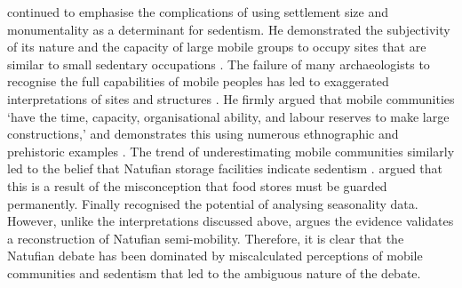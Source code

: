 \documentclass[%
	]{ijsra}
\begin{document}
\textcite[17]{Edwards_1989} continued to emphasise the complications of using settlement size and monumentality as a determinant for sedentism. He demonstrated the subjectivity of its nature and the capacity of large mobile groups to occupy sites that are similar to small sedentary occupations \parencite[17]{Edwards_1989}. 
The failure of many archaeologists to recognise the full capabilities of mobile peoples has led to exaggerated interpretations of sites and structures \parencite[17]{Edwards_1989}. 
He firmly argued that mobile communities ‘have the time, capacity, organisational ability, and labour reserves to make large constructions,’ and demonstrates this using numerous ethnographic and prehistoric examples \parencite[17]{Edwards_1989}. The trend of underestimating mobile communities similarly led to the belief that Natufian storage facilities indicate sedentism \parencite[25]{Edwards_1989}. 
\textcite[25]{Edwards_1989} argued that this is a result of the misconception that food stores must be guarded permanently. 
Finally \textcite[29]{Edwards_1989} recognised the potential of analysing seasonality data. However, unlike the interpretations discussed above, \textcite[29]{Edwards_1989} argues the evidence validates a reconstruction of Natufian semi-mobility. Therefore, it is clear that the Natufian debate has been dominated by miscalculated perceptions of mobile communities and sedentism that led to the ambiguous nature of the debate.
\end{document}
